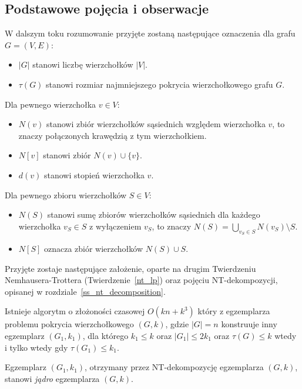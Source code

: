 \subsection{Podstawowe pojęcia i obserwacje}\label{ss_ckx_preliminaries}
\par{
  W dalszym toku rozumowanie przyjęte zostaną następujące oznaczenia dla grafu $G=(V, E)$:
  \begin{itemize}
    \item $|G|$ stanowi liczbę wierzchołków $|V|$.
    \item $\tau(G)$ stanowi rozmiar najmniejszego pokrycia wierzchołkowego grafu $G$.
  \end{itemize}
  Dla pewnego wierzchołka $v \in V$:
  \begin{itemize}
    \item $N(v)$ stanowi zbiór wierzchołków sąsiednich względem wierzchołka $v$, to znaczy połączonych krawędzią z tym wierzchołkiem.
    \item $N[v]$ stanowi zbiór $N(v) \cup \{v\}$.
    \item $d(v)$ stanowi stopień wierzchołka $v$.
  \end{itemize}
  Dla pewnego zbioru wierzchołków $S \in V$:
  \begin{itemize}
    \item $N(S)$ stanowi sumę zbiorów wierzchołków sąsiednich dla każdego wierzchołka $v_S \in S$ z wyłączeniem $v_S$, to znaczy $N(S)=\bigcup_{v_S\in S}N(v_S) \setminus S$.
    \item $N[S]$ oznacza zbiór wierzchołków $N(S) \cup S$.
  \end{itemize}

  Przyjęte zostaje następujące założenie, oparte na drugim Twierdzeniu Nemhausera-Trottera (Twierdzenie~\ref{nt_lp}) oraz pojęciu NT-dekompozycji, opisanej w rozdziale~\ref{ss_nt_decomposition}.
  \begin{proposition}
    Istnieje algorytm o złożoności czasowej $O(kn + k^3)$ który z egzemplarza problemu pokrycia wierzchołkowego $(G, k)$, gdzie $|G|=n$ konstruuje inny egzemplarz $(G_1, k_1)$, dla którego $k_1 \leq k$ oraz $|G_1| \leq 2k_1$ oraz $\tau(G) \leq k$ wtedy i tylko wtedy gdy $\tau(G_1) \leq k_1$.
  \end{proposition}

  \begin{definition}
    Egzemplarz $(G_1, k_1)$, otrzymany przez NT-dekompozycję egzemplarza $(G, k)$, stanowi \emph{jądro} egzemplarza $(G, k)$.
  \end{definition}
}
